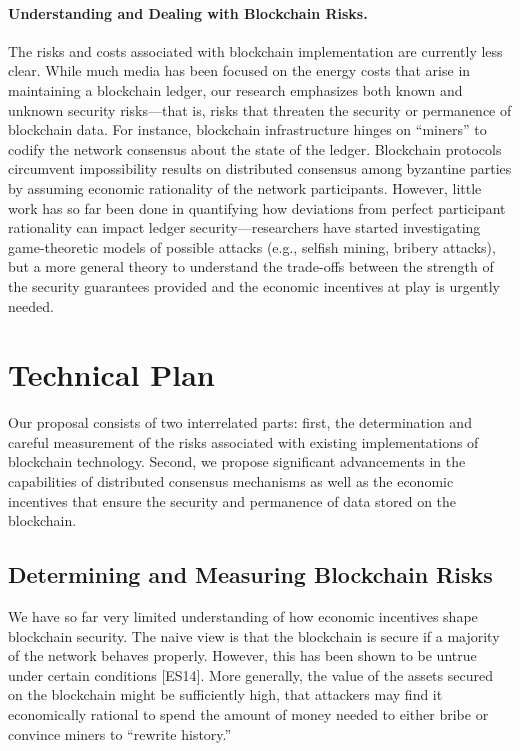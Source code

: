 \documentclass[runningheads, 12pt]{article}
\begin{document}
\paragraph{Understanding and Dealing with Blockchain Risks.} The risks and costs associated with blockchain implementation are currently less clear. While much media has been focused on the energy costs that arise in maintaining a blockchain ledger, our research emphasizes both known and unknown security risks---that is, risks that threaten the security or permanence of blockchain data. For instance, blockchain infrastructure hinges on “miners” to codify the network consensus about the state of the ledger. Blockchain protocols circumvent impossibility results on distributed consensus among byzantine parties by assuming economic rationality of the network participants. However, little work has so far been done in quantifying how deviations from perfect participant rationality can impact ledger security---researchers have started investigating game-theoretic models of possible attacks (e.g., selfish mining, bribery attacks), but a more general theory to understand the trade-offs between the strength of the security guarantees provided and the economic incentives at play is urgently needed.



\section{Technical Plan}


Our proposal consists of two interrelated parts: first, the determination and careful measurement of the risks associated with existing implementations of blockchain technology. Second, we propose significant advancements in the capabilities of distributed consensus mechanisms as well as the economic incentives that ensure the security and permanence of data stored on the blockchain.

\subsection{Determining and Measuring Blockchain Risks} 
We have so far very limited understanding of how economic incentives shape blockchain security. The naive view is that the blockchain is secure if a majority of the network behaves properly. However, this has been shown to be untrue under certain conditions [ES14]. More generally, the value of the assets secured on the blockchain might be sufficiently high, that attackers may find it economically rational to spend the amount of money needed to either bribe or convince miners to “rewrite history.”
\end{document}
